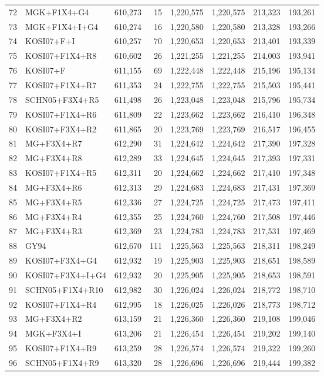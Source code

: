 \begin{table}
\begin{longtable}{rlrrrrrr}
72&MGK+F1X4+G4&610,273&15&1,220,575&1,220,575&213,323&193,261\\
73&MGK+F1X4+I+G4&610,274&16&1,220,580&1,220,580&213,328&193,266\\
74&KOSI07+F+I&610,257&70&1,220,653&1,220,653&213,401&193,339\\
75&KOSI07+F1X4+R8&610,602&26&1,221,255&1,221,255&214,003&193,941\\
76&KOSI07+F&611,155&69&1,222,448&1,222,448&215,196&195,134\\
77&KOSI07+F1X4+R7&611,353&24&1,222,755&1,222,755&215,503&195,441\\
78&SCHN05+F3X4+R5&611,498&26&1,223,048&1,223,048&215,796&195,734\\
79&KOSI07+F1X4+R6&611,809&22&1,223,662&1,223,662&216,410&196,348\\
80&KOSI07+F3X4+R2&611,865&20&1,223,769&1,223,769&216,517&196,455\\
81&MG+F3X4+R7&612,290&31&1,224,642&1,224,642&217,390&197,328\\
82&MG+F3X4+R8&612,289&33&1,224,645&1,224,645&217,393&197,331\\
83&KOSI07+F1X4+R5&612,311&20&1,224,662&1,224,662&217,410&197,348\\
84&MG+F3X4+R6&612,313&29&1,224,683&1,224,683&217,431&197,369\\
85&MG+F3X4+R5&612,336&27&1,224,725&1,224,725&217,473&197,411\\
86&MG+F3X4+R4&612,355&25&1,224,760&1,224,760&217,508&197,446\\
87&MG+F3X4+R3&612,369&23&1,224,783&1,224,783&217,531&197,469\\
88&GY94&612,670&111&1,225,563&1,225,563&218,311&198,249\\
89&KOSI07+F3X4+G4&612,932&19&1,225,903&1,225,903&218,651&198,589\\
90&KOSI07+F3X4+I+G4&612,932&20&1,225,905&1,225,905&218,653&198,591\\
91&SCHN05+F1X4+R10&612,982&30&1,226,024&1,226,024&218,772&198,710\\
92&KOSI07+F1X4+R4&612,995&18&1,226,025&1,226,026&218,773&198,712\\
93&MG+F3X4+R2&613,159&21&1,226,360&1,226,360&219,108&199,046\\
94&MGK+F3X4+I&613,206&21&1,226,454&1,226,454&219,202&199,140\\
95&KOSI07+F1X4+R9&613,259&28&1,226,574&1,226,574&219,322&199,260\\
96&SCHN05+F1X4+R9&613,320&28&1,226,696&1,226,696&219,444&199,382\\

\end{longtable}
\end{table}
